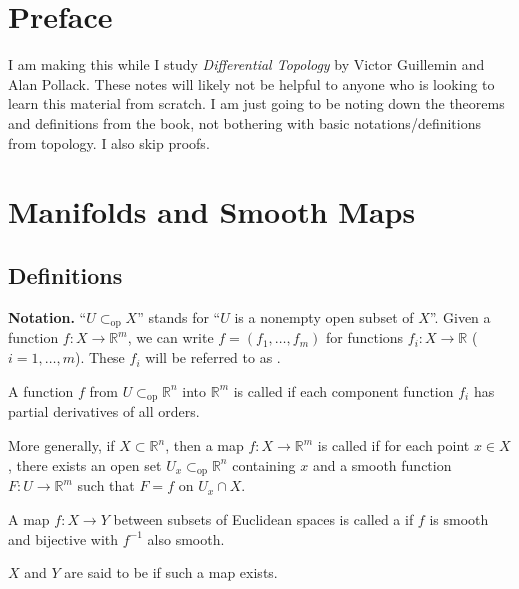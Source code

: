 \documentclass[12pt]{article}
\newcommand{\opsub}{\subset_{\operatorname{op}}}
\begin{document}
\coverpage
\thispagestyle{empty}
\updated{\today}
\thispagestyle{empty}
\tableofcontents
\pagestyle{fancy}
\setcounter{page}{1}
\setcounter{section}{-1}

\section{Preface}

I am making this while I study \emph{Differential Topology} by Victor Guillemin and Alan Pollack. These notes will likely not be helpful to anyone who is looking to learn this material from scratch. I am just going to be noting down the theorems and definitions from the book, not bothering with basic notations/definitions from topology. I also skip proofs.

\section{Manifolds and Smooth Maps}
\subsection{Definitions}

\textbf{Notation.} ``$U \opsub X$'' stands for ``$U$ is a nonempty open subset of $X$''. \newline
Given a function $f : X \to \mathbb{R}^{m}$, we can write $f = (f_{1}, \ldots, f_{m})$ for functions $f_{i} : X \to \mathbb{R}$ ($i = 1, \ldots, m$). These $f_{i}$ will be referred to as .

\begin{defn}
	A function $f$ from $U \opsub \mathbb{R}^{n}$ into $\mathbb{R}^{m}$ is called  if each component function $f_{i}$ has partial derivatives of all orders.

	More generally, if $X \subset \mathbb{R}^{n}$, then a map $f : X \to \mathbb{R}^{m}$ is called  if for each point $x \in X$, there exists an open set $U_{x} \opsub \mathbb{R}^{n}$ containing $x$ and a smooth function $F : U \to \mathbb{R}^{m}$ such that $F = f$ on $U_{x} \cap X$.
\end{defn}

\begin{defn}
	A map $f : X \to Y$ between subsets of Euclidean spaces is called a  if $f$ is smooth and bijective with $f^{-1}$ also smooth.

	$X$ and $Y$ are said to be  if such a map exists.
\end{defn}
\end{document}
